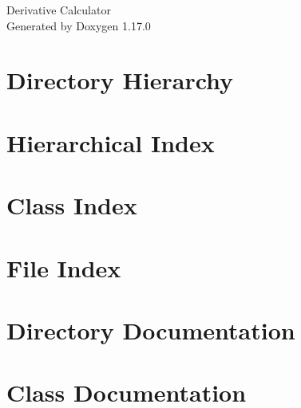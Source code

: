 \documentclass[twoside]{book}
\newcommand{\+}{\discretionary{\mbox{\scriptsize$\hookleftarrow$}}{}{}}
\newcommand{\clearemptydoublepage}{%
    \newpage{\pagestyle{empty}\cleardoublepage}%
  }
\begin{document}
  \raggedbottom
    \hypersetup{pageanchor=false,
                bookmarksnumbered=true,
                pdfencoding=unicode
               }
  \begin{titlepage}
  \vspace*{7cm}
  \begin{center}%
  {\Large Derivative Calculator}\\
  \vspace*{1cm}
  {\large Generated by Doxygen 1.17.0}\\
  \end{center}
  \end{titlepage}
  \clearemptydoublepage
  \tableofcontents
  \clearemptydoublepage
  \hypersetup{pageanchor=true}

\chapter{Directory Hierarchy}

\chapter{Hierarchical Index}

\chapter{Class Index}

\chapter{File Index}

\chapter{Directory Documentation}


\chapter{Class Documentation}




























\end{document}
